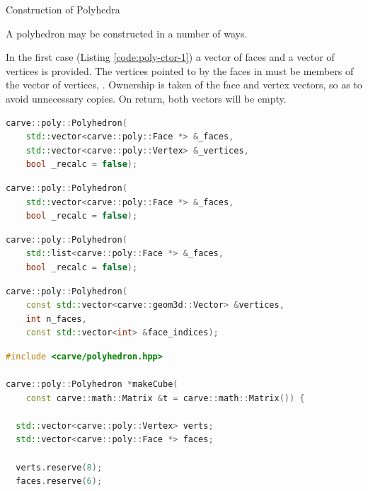 \documentclass{carve}
\begin{document}
\begin{section}{Construction of Polyhedra}

A polyhedron may be constructed in a number of ways.

In the first case (Listing \ref{code:poly-ctor-1}) a vector of faces
and a vector of vertices is provided. The vertices pointed to by the
faces in  must be members of the vector of vertices,
. Ownership is taken of the face and vertex vectors,
so as to avoid unnecessary copies. On return, both vectors will be
empty.

\begin{lstlisting}[language=C++,float,caption=\code{carve::poly::Polyhedron} constructor 1,label=code:poly-ctor-1]
carve::poly::Polyhedron(
    std::vector<carve::poly::Face *> &_faces,
    std::vector<carve::poly::Vertex> &_vertices,
    bool _recalc = false);
\end{lstlisting}

\begin{lstlisting}[language=C++,float,caption=\code{carve::poly::Polyhedron} constructor 2,label=code:poly-ctor-2]
carve::poly::Polyhedron(
    std::vector<carve::poly::Face *> &_faces,
    bool _recalc = false);
\end{lstlisting}

\begin{lstlisting}[language=C++,float,caption=\code{carve::poly::Polyhedron} constructor 3,label=code:poly-ctor-3]
carve::poly::Polyhedron(
    std::list<carve::poly::Face *> &_faces,
    bool _recalc = false);
\end{lstlisting}

\begin{lstlisting}[language=C++,float,caption=\code{carve::poly::Polyhedron} constructor 4,label=code:poly-ctor-4]
carve::poly::Polyhedron(
    const std::vector<carve::geom3d::Vector> &vertices,
    int n_faces,
    const std::vector<int> &face_indices);
\end{lstlisting}

\begin{lstlisting}[float,language=C++,caption=Constructing a cube directly,label=code:cube-direct]
#include <carve/polyhedron.hpp>

carve::poly::Polyhedron *makeCube(
    const carve::math::Matrix &t = carve::math::Matrix()) {

  std::vector<carve::poly::Vertex> verts;
  std::vector<carve::poly::Face *> faces;
  
  verts.reserve(8);
  faces.reserve(6);


\end{lstlisting}
\end{section}
\end{document}
